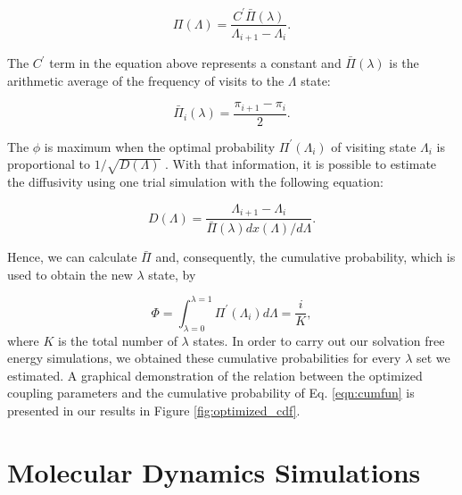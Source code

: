 \documentclass[final,12p,times,twocolumn]{elsarticle}
\begin{document}
	\begin{equation}
	\Pi (\Lambda) = \dfrac{C^{'} \bar{\Pi} (\lambda)}{\Lambda_{i+1} - \Lambda_{i}}.
	\label{eqn:plambda}
	\end{equation}
	
	The $C^{'} $ term in the equation above represents a constant and $\bar{\Pi} (\lambda)$ is the arithmetic average of the frequency of visits to the $\Lambda$ state:
	
	\begin{equation}
	\bar{\Pi}_{i} (\lambda) = \dfrac{\pi_{i+1} - \pi_{i}}{2}.
	\label{eqn:barplambda}
	\end{equation}
	
	The $\phi$ is maximum when the optimal probability $\Pi^{'}(\Lambda_{i})$ of visiting state $\Lambda_{i}$ is proportional to $1/\sqrt{D(\Lambda)}$ \cite{trebst2004}. With that information, it is possible to estimate the diffusivity using one trial simulation with the following equation:
	
	\begin{equation}
	D(\Lambda) = \dfrac{\Lambda_{i+1} - \Lambda_{i}}{\bar{\Pi} (\lambda) {dx(\Lambda)}/{d \Lambda}}.
	\label{eqn:diff}
	\end{equation}
	
	Hence, we can calculate $\bar{\Pi} $ and, consequently, the cumulative probability, which is used to obtain the new $\lambda$ state, by
	
	\begin{equation}
	\Phi = \int_{\lambda =0}^{\lambda =1} \Pi^{'}(\Lambda_{i}) d \Lambda = \dfrac{i}{K},
	\label{eqn:cumfun}
	\end{equation}
	where $K$ is the total number of $\lambda$ states. In order to carry out our solvation free energy simulations, we obtained these cumulative probabilities for every $\lambda$ set we estimated. A graphical demonstration of the relation between the optimized coupling parameters and the cumulative probability of Eq. \ref{eqn:cumfun} is presented in our results in Figure \ref{fig:optimized_cdf}.
	
	\section{Molecular Dynamics Simulations}\label{mds}
	
\end{document}

